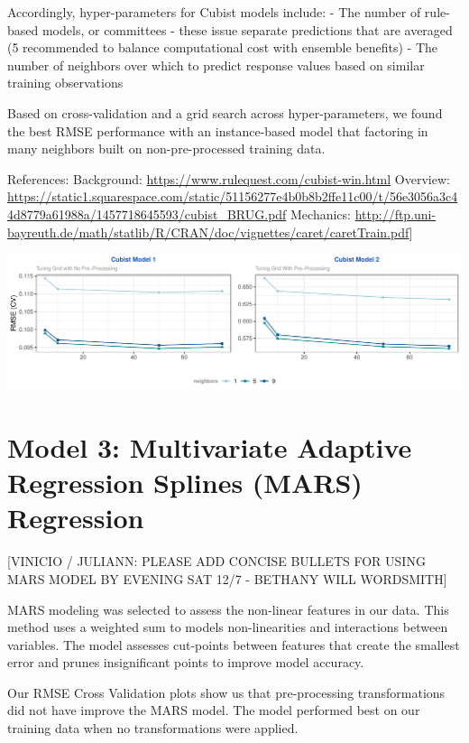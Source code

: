 \documentclass[]{report}
\begin{document}
Accordingly, hyper-parameters for Cubist models include: - The number of
rule-based models, or committees - these issue separate predictions that
are averaged (5 recommended to balance computational cost with ensemble
benefits) - The number of neighbors over which to predict response
values based on similar training observations

Based on cross-validation and a grid search across hyper-parameters, we
found the best RMSE performance with an instance-based model that
factoring in many neighbors built on non-pre-processed training data.

References: Background: \url{https://www.rulequest.com/cubist-win.html}
Overview:
\url{https://static1.squarespace.com/static/51156277e4b0b8b2ffe11c00/t/56e3056a3c44d8779a61988a/1457718645593/cubist_BRUG.pdf}
Mechanics:
\url{http://ftp.uni-bayreuth.de/math/statlib/R/CRAN/doc/vignettes/caret/caretTrain.pdf}{]}

\includegraphics{CONFLICT_Project_Update_files/figure-latex/unnamed-chunk-10-1.pdf}

\hypertarget{model-3-multivariate-adaptive-regression-splines-mars-regression}{%
\section{Model 3: Multivariate Adaptive Regression Splines (MARS)
Regression}\label{model-3-multivariate-adaptive-regression-splines-mars-regression}}

{[}VINICIO / JULIANN: PLEASE ADD CONCISE BULLETS FOR USING MARS MODEL BY
EVENING SAT 12/7 - BETHANY WILL WORDSMITH{]}

MARS modeling was selected to assess the non-linear features in our
data. This method uses a weighted sum to models non-linearities and
interactions between variables. The model assesses cut-points between
features that create the smallest error and prunes insignificant points
to improve model accuracy.

Our RMSE Cross Validation plots show us that pre-processing
transformations did not have improve the MARS model. The model performed
best on our training data when no transformations were applied.
\end{document}
